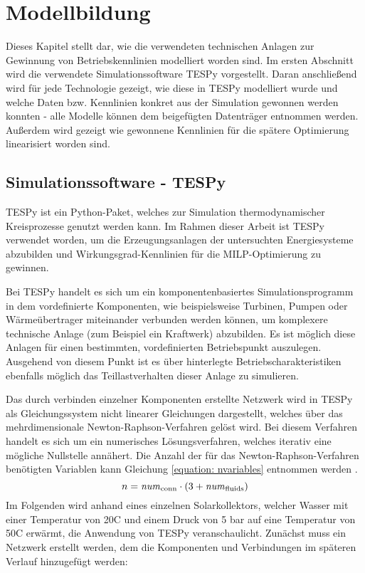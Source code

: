 \chapter{Modellbildung}\label{chapter: Modellbildung}
\thispagestyle{empty}
Dieses Kapitel stellt dar, wie die verwendeten technischen Anlagen zur Gewinnung von Betriebskennlinien modelliert worden sind. Im ersten Abschnitt wird die verwendete Simulationssoftware \acf{TESPy} vorgestellt. Daran anschließend wird für jede Technologie gezeigt, wie diese in \ac{TESPy} modelliert wurde und welche Daten bzw. Kennlinien konkret aus der Simulation gewonnen werden konnten - alle Modelle können dem beigefügten Datenträger entnommen werden. Außerdem wird gezeigt wie gewonnene Kennlinien für die spätere Optimierung linearisiert worden sind. 

\section{Simulationssoftware - TESPy}\label{section: TESPy}
\ac{TESPy} ist ein Python-Paket, welches zur Simulation thermodynamischer Kreisprozesse genutzt werden kann. Im Rahmen dieser Arbeit ist \ac{TESPy} verwendet worden, um die Erzeugungsanlagen der untersuchten Energiesysteme abzubilden und Wirkungsgrad-Kennlinien für die \ac{MILP}-Optimierung zu gewinnen. 

Bei \ac{TESPy} handelt es sich um ein komponentenbasiertes Simulationsprogramm in dem vordefinierte Komponenten, wie beispielsweise Turbinen, Pumpen oder Wärmeübertrager miteinander verbunden werden können, um komplexere technische Anlage (zum Beispiel ein Kraftwerk) abzubilden. Es ist möglich diese Anlagen für einen bestimmten, vordefinierten Betriebspunkt auszulegen. Ausgehend von diesem Punkt ist es über hinterlegte Betriebscharakteristiken ebenfalls möglich das Teillastverhalten dieser Anlage zu simulieren. 

Das durch verbinden einzelner Komponenten erstellte Netzwerk wird in \ac{TESPy} als Gleichungssystem nicht linearer Gleichungen dargestellt, welches über das mehrdimensionale Newton-Raphson-Verfahren gelöst wird. Bei diesem Verfahren handelt es sich um ein numerisches Lösungsverfahren, welches iterativ eine mögliche Nullstelle annähert. Die Anzahl der für das Newton-Raphson-Verfahren benötigten Variablen kann Gleichung \ref{equation: nvariables} entnommen werden \cite{TESPy2019}.
	\begin{equation}\label{equation: nvariables}
		n = \text{\textit{num}}_\text{conn} \cdot (3 + \text{\textit{num}}_\text{fluids})
	\end{equation}
Im Folgenden wird anhand eines einzelnen Solarkollektors, welcher Wasser mit einer Temperatur von 20\textdegree C und einem Druck von 5 bar auf eine Temperatur von 50\textdegree C erwärmt, die Anwendung von TESPy veranschaulicht. Zunächst muss ein Netzwerk erstellt werden, dem die Komponenten und Verbindungen im späteren Verlauf hinzugefügt werden:

